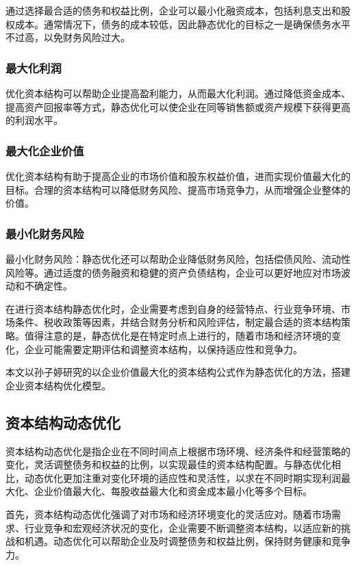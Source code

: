 通过选择最合适的债务和权益比例，企业可以最小化融资成本，包括利息支出和股权成本。通常情况下，债务的成本较低，因此静态优化的目标之一是确保债务水平不过高，以免财务风险过大。
\subsubsection{最大化利润}
优化资本结构可以帮助企业提高盈利能力，从而最大化利润。通过降低资金成本、提高资产回报率等方式，静态优化可以使企业在同等销售额或资产规模下获得更高的利润水平。
\subsubsection{最大化企业价值}
优化资本结构有助于提高企业的市场价值和股东权益价值，进而实现价值最大化的目标。合理的资本结构可以降低财务风险、提高市场竞争力，从而增强企业整体的价值。
\subsubsection{最小化财务风险}
最小化财务风险：静态优化还可以帮助企业降低财务风险，包括偿债风险、流动性风险等。通过适度的债务融资和稳健的资产负债结构，企业可以更好地应对市场波动和不确定性。

在进行资本结构静态优化时，企业需要考虑到自身的经营特点、行业竞争环境、市场条件、税收政策等因素，并结合财务分析和风险评估，制定最合适的资本结构策略。值得注意的是，静态优化是在特定时点上进行的，随着市场和经济环境的变化，企业可能需要定期评估和调整资本结构，以保持适应性和竞争力。\cite{Wan2022}

本文以孙子婷研究的以企业价值最大化的资本结构公式\cite{Su2022}作为静态优化的方法，搭建企业资本结构优化模型。 

\subsection{资本结构动态优化}
资本结构动态优化是指企业在不同时间点上根据市场环境、经济条件和经营策略的变化，灵活调整债务和权益的比例，以实现最佳的资本结构配置。与静态优化相比，动态优化更加注重对变化环境的适应性和灵活性，以求在不同时期实现利润最大化、企业价值最大化、每股收益最大化和资金成本最小化等多个目标。

首先，资本结构动态优化强调了对市场和经济环境变化的灵活应对。随着市场需求、行业竞争和宏观经济状况的变化，企业需要不断调整资本结构，以适应新的挑战和机遇。动态优化可以帮助企业及时调整债务和权益比例，保持财务健康和竞争力。

